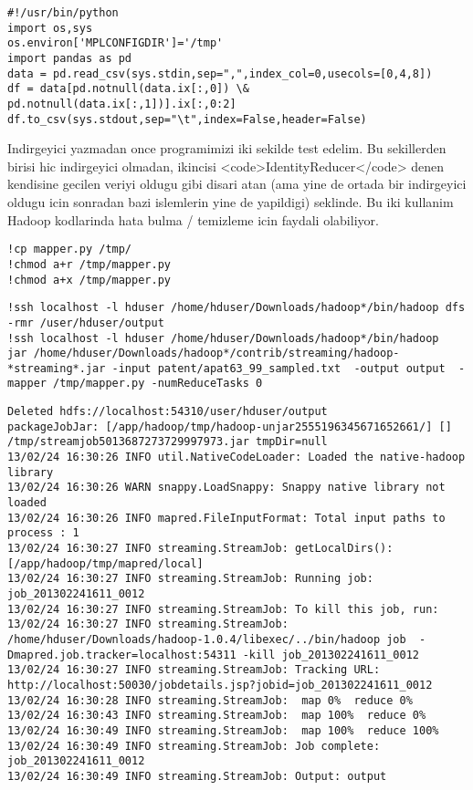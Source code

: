 \documentclass[12pt,fleqn]{article}\usepackage{../common}
\begin{document}
\begin{verbatim}
#!/usr/bin/python
import os,sys
os.environ['MPLCONFIGDIR']='/tmp' 
import pandas as pd
data = pd.read_csv(sys.stdin,sep=",",index_col=0,usecols=[0,4,8])
df = data[pd.notnull(data.ix[:,0]) \& pd.notnull(data.ix[:,1])].ix[:,0:2]
df.to_csv(sys.stdout,sep="\t",index=False,header=False)
\end{verbatim}

Indirgeyici yazmadan once programimizi iki sekilde test edelim. Bu
sekillerden birisi hic indirgeyici olmadan, ikincisi
<code>IdentityReducer</code> denen kendisine gecilen veriyi oldugu
gibi disari atan (ama yine de ortada bir indirgeyici oldugu icin
sonradan bazi islemlerin yine de yapildigi) seklinde. Bu iki kullanim
Hadoop kodlarinda hata bulma / temizleme icin faydali olabiliyor.

\begin{verbatim}
!cp mapper.py /tmp/
!chmod a+r /tmp/mapper.py
!chmod a+x /tmp/mapper.py
\end{verbatim}

\begin{verbatim}
!ssh localhost -l hduser /home/hduser/Downloads/hadoop*/bin/hadoop dfs -rmr /user/hduser/output
!ssh localhost -l hduser /home/hduser/Downloads/hadoop*/bin/hadoop  jar /home/hduser/Downloads/hadoop*/contrib/streaming/hadoop-*streaming*.jar -input patent/apat63_99_sampled.txt  -output output  -mapper /tmp/mapper.py -numReduceTasks 0 
\end{verbatim}

\begin{verbatim}
Deleted hdfs://localhost:54310/user/hduser/output
packageJobJar: [/app/hadoop/tmp/hadoop-unjar2555196345671652661/] [] /tmp/streamjob5013687273729997973.jar tmpDir=null
13/02/24 16:30:26 INFO util.NativeCodeLoader: Loaded the native-hadoop library
13/02/24 16:30:26 WARN snappy.LoadSnappy: Snappy native library not loaded
13/02/24 16:30:26 INFO mapred.FileInputFormat: Total input paths to process : 1
13/02/24 16:30:27 INFO streaming.StreamJob: getLocalDirs(): [/app/hadoop/tmp/mapred/local]
13/02/24 16:30:27 INFO streaming.StreamJob: Running job: job_201302241611_0012
13/02/24 16:30:27 INFO streaming.StreamJob: To kill this job, run:
13/02/24 16:30:27 INFO streaming.StreamJob: /home/hduser/Downloads/hadoop-1.0.4/libexec/../bin/hadoop job  -Dmapred.job.tracker=localhost:54311 -kill job_201302241611_0012
13/02/24 16:30:27 INFO streaming.StreamJob: Tracking URL: http://localhost:50030/jobdetails.jsp?jobid=job_201302241611_0012
13/02/24 16:30:28 INFO streaming.StreamJob:  map 0%  reduce 0%
13/02/24 16:30:43 INFO streaming.StreamJob:  map 100%  reduce 0%
13/02/24 16:30:49 INFO streaming.StreamJob:  map 100%  reduce 100%
13/02/24 16:30:49 INFO streaming.StreamJob: Job complete: job_201302241611_0012
13/02/24 16:30:49 INFO streaming.StreamJob: Output: output
\end{verbatim}
\end{document}
